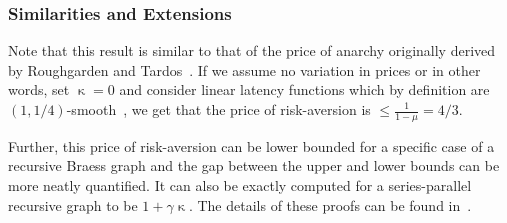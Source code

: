 \subsubsection{Similarities and Extensions} Note that this result is similar to that of the price of anarchy originally derived by Roughgarden and Tardos~\cite{tardos}. If we assume no variation in prices or in other words, 
set $\upkappa = 0$ and consider linear latency functions which by definition are $(1, 1/4)$-smooth~\cite{tardos-notes}, we get that the price of risk-aversion is $\leq \displaystyle \frac{1}{1 - \mu} = 4/3$.

Further, this price of risk-aversion can be lower bounded for a specific case of a recursive Braess graph  and the gap between the upper and
lower bounds can be more neatly quantified. It can also be exactly computed for a series-parallel recursive graph to be $1 + \gamma \upkappa$. The details of these proofs can be found
in~\cite{risk-averse}.
